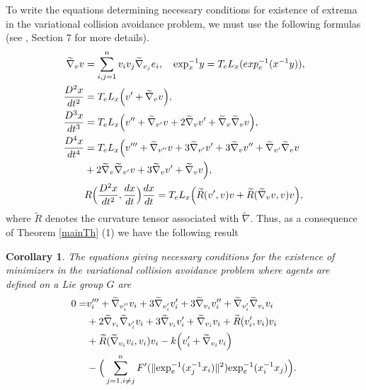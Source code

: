 \documentclass[letterpaper, 10 pt, conference]{ieeeconf}  %
\newtheorem{corollary}[definition]{Corollary}
\begin{document}
To write the equations determining necessary conditions for existence of extrema in the variational collision avoidance problem, we must use the following formulas (see \cite{Altafini}, Section $7$ for more details).
\begin{align*}
\widetilde{\nabla}_vv &= \sum\limits_{i,j=1}^{n}v_iv_j\widetilde{\nabla}_{e_j}e_i,\quad \hbox{exp}^{-1}_{x}y = T_eL_x(exp_e^{-1}(x^{-1}y)),
 \\
\frac{D^2x}{dt^2} &= T_eL_x\Big(v' + \widetilde{\nabla}_vv\Big), \\
\frac{D^3x}{dt^3} &= T_eL_x\Big(v'' + \widetilde{\nabla}_{v'}v + 2\widetilde{\nabla}_{v}v' +\widetilde{\nabla}_v\widetilde{\nabla}_vv\Big), \\
\frac{D^4x}{dt^4} &= T_eL_x\Big(v''' + \widetilde{\nabla}_{v''}v + 3\widetilde{\nabla}_{v'}v' + 3\widetilde{\nabla}_{v}v'' + \widetilde{\nabla}_{v'}\widetilde{\nabla}_{v}v
\\
&+ 2\widetilde{\nabla}_{v}\widetilde{\nabla}_{v'}v + 3\widetilde{\nabla}_{v}v' + \widetilde{\nabla}_{v}v\Big), \\
&R\Big(\frac{D^2x}{dt^2} , \frac{dx}{dt} \Big)\frac{dx}{dt} = T_eL_x\Big(\widetilde{R}(v',v)v + \widetilde{R}(\widetilde{\nabla}_{v}v,v)v\Big), 
\end{align*} where $\widetilde{R}$ denotes the curvature tensor associated with $\widetilde{\nabla}$. Thus, as a consequence of Theorem \ref{mainTh} (1) we have the following result

\begin{corollary}\label{corollary2}
 The equations giving necessary conditions for the existence of minimizers in the variational collision avoidance problem where agents are defined on a Lie group $G$ are
\begin{equation*}
\begin{split}
0=&v_i''' + \widetilde{\nabla}_{v_i''}v_i + 3\widetilde{\nabla}_{v_i'}v_i' + 3\widetilde{\nabla}_{v_i}v_i'' + \widetilde{\nabla}_{v_i'}\widetilde{\nabla}_{v_i}v_i \\ & + 2\widetilde{\nabla}_{v_i}\widetilde{\nabla}_{v_i'}v_i + 3\widetilde{\nabla}_{v_i}v_i' + \widetilde{\nabla}_{v_i}v_i + \widetilde{R}(v_i',v_i)v_i\\ & + \widetilde{R}(\widetilde{\nabla}_{v_i}v_i,v_i)v_i - k\Big(v_i' + \widetilde{\nabla}_{v_i}v_i\Big) \\ & - \Big( \sum\limits_{j=1,i\neq j}^{n} F'(\|\hbox{exp}^{-1}_{e}(x_{j}^{-1}x_{i})\|^2)\hbox{exp}^{-1}_{e}(x_{i}^{-1}x_{j}) \Big).
\end{split}
\end{equation*}
\end{corollary}
\end{document}
